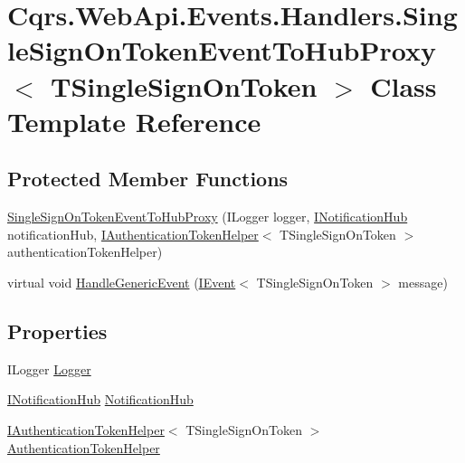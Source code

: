 \hypertarget{classCqrs_1_1WebApi_1_1Events_1_1Handlers_1_1SingleSignOnTokenEventToHubProxy}{}\section{Cqrs.\+Web\+Api.\+Events.\+Handlers.\+Single\+Sign\+On\+Token\+Event\+To\+Hub\+Proxy$<$ T\+Single\+Sign\+On\+Token $>$ Class Template Reference}
\label{classCqrs_1_1WebApi_1_1Events_1_1Handlers_1_1SingleSignOnTokenEventToHubProxy}
\subsection*{Protected Member Functions}
\begin{DoxyCompactItemize}
\item 
\hyperlink{classCqrs_1_1WebApi_1_1Events_1_1Handlers_1_1SingleSignOnTokenEventToHubProxy_ad54ad4efb19787dbf07287bf1fa7816b}{Single\+Sign\+On\+Token\+Event\+To\+Hub\+Proxy} (I\+Logger logger, \hyperlink{interfaceCqrs_1_1WebApi_1_1SignalR_1_1Hubs_1_1INotificationHub}{I\+Notification\+Hub} notification\+Hub, \hyperlink{interfaceCqrs_1_1Authentication_1_1IAuthenticationTokenHelper}{I\+Authentication\+Token\+Helper}$<$ T\+Single\+Sign\+On\+Token $>$ authentication\+Token\+Helper)
\item 
virtual void \hyperlink{classCqrs_1_1WebApi_1_1Events_1_1Handlers_1_1SingleSignOnTokenEventToHubProxy_ad8ecdd318f7dc37de14760879fd52668}{Handle\+Generic\+Event} (\hyperlink{interfaceCqrs_1_1Events_1_1IEvent}{I\+Event}$<$ T\+Single\+Sign\+On\+Token $>$ message)
\end{DoxyCompactItemize}
\subsection*{Properties}
\begin{DoxyCompactItemize}
\item 
I\+Logger \hyperlink{classCqrs_1_1WebApi_1_1Events_1_1Handlers_1_1SingleSignOnTokenEventToHubProxy_a64eb9e620b1d0474ed7f0f2a4fad9ac1}{Logger}
\item 
\hyperlink{interfaceCqrs_1_1WebApi_1_1SignalR_1_1Hubs_1_1INotificationHub}{I\+Notification\+Hub} \hyperlink{classCqrs_1_1WebApi_1_1Events_1_1Handlers_1_1SingleSignOnTokenEventToHubProxy_a9621749560e567a6252f3d7e2328174d}{Notification\+Hub}
\item 
\hyperlink{interfaceCqrs_1_1Authentication_1_1IAuthenticationTokenHelper}{I\+Authentication\+Token\+Helper}$<$ T\+Single\+Sign\+On\+Token $>$ \hyperlink{classCqrs_1_1WebApi_1_1Events_1_1Handlers_1_1SingleSignOnTokenEventToHubProxy_af317368318ce327bf520255c420e0b18}{Authentication\+Token\+Helper}
\end{DoxyCompactItemize}


